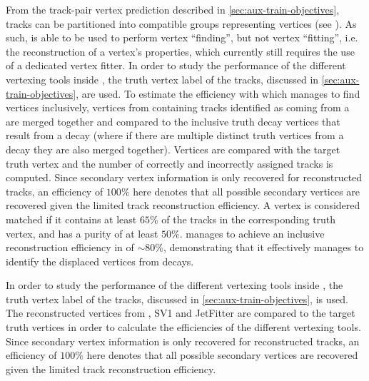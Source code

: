 From the track-pair vertex prediction described in \cref{sec:aux-train-objectives}, tracks can be partitioned into compatible groups representing vertices (see \cite{serviansky2020set2graph}).
As such, \GNN is able to be used to perform vertex ``finding'', but not vertex ``fitting'', i.e. the reconstruction of a vertex's properties, which currently still requires the use of a dedicated vertex fitter.
In order to study the performance of the different vertexing tools inside \bjets, the truth vertex label of the tracks, discussed in \cref{sec:aux-train-objectives}, are used.
To estimate the efficiency with which \GNN manages to find vertices inclusively, vertices from \GNN containing tracks identified as coming from a \bhadron are merged together and compared to the inclusive truth decay vertices that result from a \bhadron decay (where if there are multiple distinct truth vertices from a \bhadron decay they are also merged together).
Vertices are compared with the target truth vertex and the number of correctly and incorrectly assigned tracks is computed.
Since secondary vertex information is only recovered for reconstructed tracks, an efficiency of $100\%$ here denotes that all possible secondary vertices are recovered given the limited track reconstruction efficiency.
A vertex is considered matched if it contains at least $65\%$ of the tracks in the corresponding truth vertex, and has a purity of at least $50\%$.
\GNN manages to achieve an inclusive reconstruction efficiency in \bjets of $\sim80\%$, demonstrating that it effectively manages to identify the displaced vertices from \bhadron decays.


In order to study the performance of the different vertexing tools inside \bjets, the truth vertex label of the tracks, discussed in \cref{sec:aux-train-objectives}, is used.
The reconstructed vertices from \GNN, SV1 and JetFitter are compared to the target truth vertices in order to calculate the efficiencies of the different vertexing tools.
Since secondary vertex information is only recovered for reconstructed tracks, an efficiency of $100\%$ here denotes that all possible secondary vertices are recovered given the limited track reconstruction efficiency.

